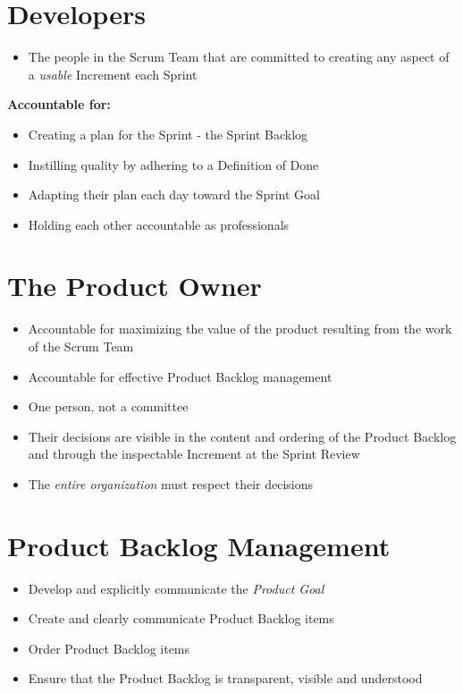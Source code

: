 \documentclass[a4paper,11pt,twocolumn]{article}
\begin{document}
\section*{Developers}
\begin{itemize}
	\item The people in the Scrum Team that are committed to creating any aspect of a \textit{usable} Increment each Sprint
\end{itemize}
\textbf{Accountable for:}
\begin{itemize}
	\item Creating a plan for the Sprint - the Sprint Backlog
	\item Instilling quality by adhering to a Definition of Done
	\item Adapting their plan each day toward the Sprint Goal
	\item Holding each other accountable as professionals
\end{itemize}

\section*{The Product Owner}
\begin{itemize}
    \item Accountable for maximizing the value of the product resulting from the work of the Scrum Team
    \item Accountable for effective Product Backlog management
    \item One person, not a committee
    \item Their decisions are visible in the content and ordering of the Product Backlog and through the inspectable Increment at the Sprint Review
    \item The \textit{entire organization} must respect their decisions
\end{itemize}

\section*{Product Backlog Management}
\begin{itemize}
    \item Develop and explicitly communicate the \textit{Product Goal}
    \item Create and clearly communicate Product Backlog items
    \item Order Product Backlog items
    \item Ensure that the Product Backlog is transparent, visible and understood
\end{itemize}
\end{document}
